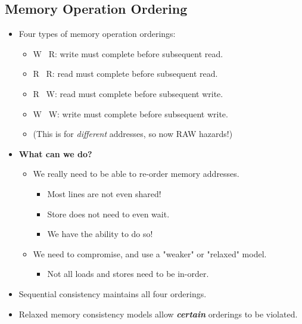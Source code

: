 \documentclass[10pt]{article}
\begin{document}
\subsection*{Memory Operation Ordering}
\begin{itemize}
    \item Four types of memory operation orderings:
    \begin{itemize}
        \item W \textrightarrow~R: write must complete before subsequent read.
        \item R \textrightarrow~R: read must complete before subsequent read.
        \item R \textrightarrow~W: read must complete before subsequent write.
        \item W \textrightarrow~W: write must complete before subsequent write.
        \item (This is for \textit{different} addresses, so now RAW hazards!)
    \end{itemize}
    \item \textbf{What can we do?}
    \begin{itemize}
        \item We really need to be able to re-order memory addresses.
        \begin{itemize}
            \item Most lines are not even shared!
            \item Store does not need to even wait.
            \item We have the ability to do so!
        \end{itemize}
        \item We need to compromise, and use a "weaker" or "relaxed" model.
        \begin{itemize}
            \item Not all loads and stores need to be in-order.
        \end{itemize}
    \end{itemize}
    \item Sequential consistency maintains all four orderings.
    \item Relaxed memory consistency models allow \textit{\textbf{certain}} orderings to be violated.
\end{itemize}
\end{document}
